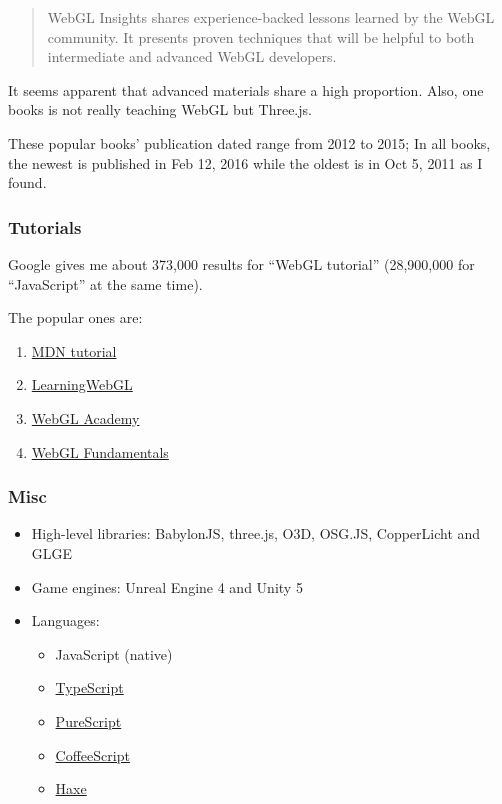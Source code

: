 \documentclass[]{article}
\begin{document}
\begin{quote}
WebGL Insights shares experience-backed lessons learned by the WebGL
community. It presents proven techniques that will be helpful to both
intermediate and advanced WebGL developers.
\end{quote}

It seems apparent that advanced materials share a high proportion. Also,
one books is not really teaching WebGL but Three.js.

These popular books' publication dated range from 2012 to 2015; In all
books, the newest is published in Feb 12, 2016 while the oldest is in
Oct 5, 2011 as I found.

\subsubsection{Tutorials}\label{tutorials}

Google gives me about 373,000 results for ``WebGL tutorial'' (28,900,000
for ``JavaScript'' at the same time).

The popular ones are:

\begin{enumerate}
\def\labelenumi{\arabic{enumi}.}
\itemsep1pt\parskip0pt
\item
  \href{https://developer.mozilla.org/en-US/docs/Web/API/WebGL_API/Tutorial}{MDN
  tutorial}
\item
  \href{http://learningwebgl.com/blog/}{LearningWebGL}
\item
  \href{http://www.webglacademy.com}{WebGL Academy}
\item
  \href{https://webglfundamentals.org}{WebGL Fundamentals}
\end{enumerate}

\subsubsection{Misc}\label{misc}

\begin{itemize}
\itemsep1pt\parskip0pt
\item
  High-level libraries: BabylonJS, three.js, O3D, OSG.JS, CopperLicht
  and GLGE
\item
  Game engines: Unreal Engine 4 and Unity 5
\item
  Languages:

  \begin{itemize}
  \itemsep1pt\parskip0pt
  \item
    JavaScript (native)
  \item
    \href{http://typescript.away3d.com}{TypeScript}
  \item
    \href{https://github.com/jutaro/purescript-webgl}{PureScript}
  \item
    \href{http://www.coffeegl.com}{CoffeeScript}
  \item
    \href{http://haxor.xyz}{Haxe}
  \end{itemize}
\end{itemize}
\end{document}
